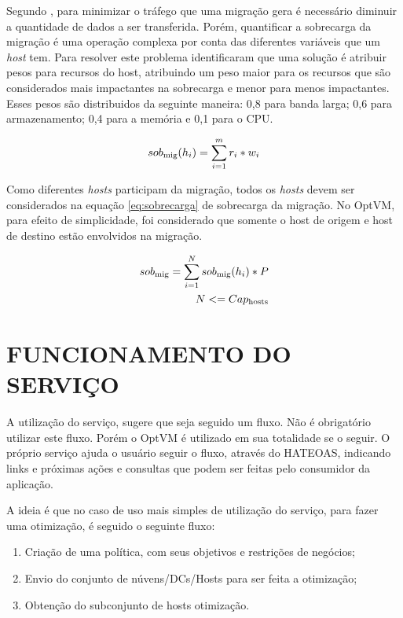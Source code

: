 Segundo \cite{anand}, para minimizar o tráfego que uma migração gera 
é necessário diminuir a quantidade de dados a ser transferida. Porém,
quantificar a sobrecarga da migração é uma operação complexa por conta 
das diferentes variáveis que um \textit{host} tem. Para resolver este problema 
\cite{anand} identificaram que uma solução é atribuir pesos para recursos do 
host, atribuindo um peso maior para os recursos que são considerados mais impactantes
na sobrecarga e menor para menos impactantes. Esses pesos são distribuidos 
da seguinte maneira: 0,8 para banda larga; 0,6 para armazenamento; 0,4 para a memória 
e 0,1 para o CPU.

\begin{equation}
sob\textsubscript{mig}(h_i) = \sum_{i=1}^{m}r_i * w_i
\label{eq:sobHi}
\end{equation}

Como diferentes \textit{hosts} participam da migração, todos os 
\textit{hosts} devem ser considerados na equação \ref{eq:sobrecarga} de 
sobrecarga da migração. No OptVM, para efeito de simplicidade, foi considerado
que somente o host de origem e host de destino estão envolvidos na migração.

\begin{equation}
\begin{split}
sob\textsubscript{mig} = \sum_{i=1}^{N}sob\textsubscript{mig}(h_i) * P  \\
N <= Cap\textsubscript{hosts}
\end{split}
\label{eq:sobrecarga}
\end{equation}

\section{FUNCIONAMENTO DO SERVIÇO}

A utilização do serviço, sugere que seja seguido um fluxo. Não é obrigatório
utilizar este fluxo. Porém o OptVM é utilizado em sua totalidade se o seguir. 
O próprio serviço ajuda o usuário seguir o fluxo, através do HATEOAS, indicando 
links e próximas ações e consultas que podem ser feitas pelo consumidor da aplicação.

A ideia é que no caso de uso mais simples de utilização do serviço, 
para fazer uma otimização, é seguido o seguinte fluxo:

\begin{enumerate}
 \item Criação de uma política, com seus objetivos e restrições de negócios;
 \item Envio do conjunto de núvens/DCs/Hosts para ser feita a otimização;
 \item Obtenção do subconjunto de hosts otimização.
\end{enumerate}

